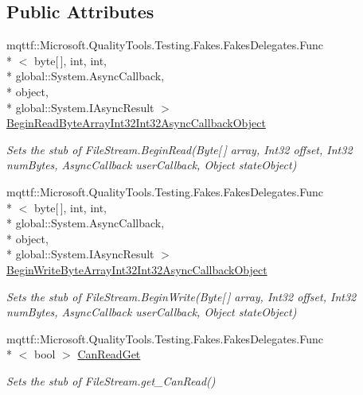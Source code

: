 \subsection*{Public Attributes}
\begin{DoxyCompactItemize}
\item 
mqttf\-::\-Microsoft.\-Quality\-Tools.\-Testing.\-Fakes.\-Fakes\-Delegates.\-Func\\*
$<$ byte\mbox{[}$\,$\mbox{]}, int, int, \\*
global\-::\-System.\-Async\-Callback, \\*
object, \\*
global\-::\-System.\-I\-Async\-Result $>$ \hyperlink{class_system_1_1_i_o_1_1_fakes_1_1_stub_file_stream_a6e34735a4b3f7a34cfd338de13226749}{Begin\-Read\-Byte\-Array\-Int32\-Int32\-Async\-Callback\-Object}
\begin{DoxyCompactList}\small\item\em Sets the stub of File\-Stream.\-Begin\-Read(\-Byte\mbox{[}$\,$\mbox{]} array, Int32 offset, Int32 num\-Bytes, Async\-Callback user\-Callback, Object state\-Object)\end{DoxyCompactList}\item 
mqttf\-::\-Microsoft.\-Quality\-Tools.\-Testing.\-Fakes.\-Fakes\-Delegates.\-Func\\*
$<$ byte\mbox{[}$\,$\mbox{]}, int, int, \\*
global\-::\-System.\-Async\-Callback, \\*
object, \\*
global\-::\-System.\-I\-Async\-Result $>$ \hyperlink{class_system_1_1_i_o_1_1_fakes_1_1_stub_file_stream_aec3cd47c26054ba35aca287b0229091f}{Begin\-Write\-Byte\-Array\-Int32\-Int32\-Async\-Callback\-Object}
\begin{DoxyCompactList}\small\item\em Sets the stub of File\-Stream.\-Begin\-Write(\-Byte\mbox{[}$\,$\mbox{]} array, Int32 offset, Int32 num\-Bytes, Async\-Callback user\-Callback, Object state\-Object)\end{DoxyCompactList}\item 
mqttf\-::\-Microsoft.\-Quality\-Tools.\-Testing.\-Fakes.\-Fakes\-Delegates.\-Func\\*
$<$ bool $>$ \hyperlink{class_system_1_1_i_o_1_1_fakes_1_1_stub_file_stream_af585e3ed673acb400090ea481ea15476}{Can\-Read\-Get}
\begin{DoxyCompactList}\small\item\em Sets the stub of File\-Stream.\-get\-\_\-\-Can\-Read()\end{DoxyCompactList}\item 

\end{DoxyCompactItemize}
